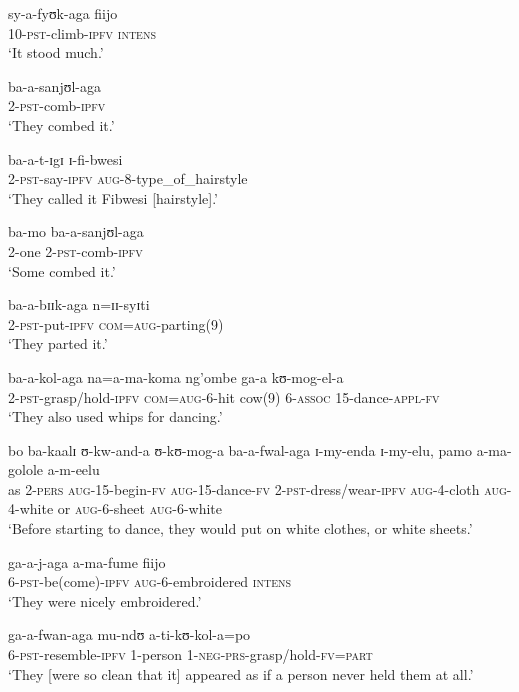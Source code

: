 \begin{exe}
\ex \gll sy-a-fyʊk-aga fiijo\\
10-\textsc{pst}-climb-\textsc{ipfv} \textsc{intens}\\
\glt \lq It stood much.'

\ex \gll ba-a-sanjʊl-aga\\
2-\textsc{pst}-comb-\textsc{ipfv}\\
\glt \lq They combed it.'

\ex \gll ba-a-t-ɪgɪ ɪ-fi-bwesi\\
2-\textsc{pst}-say-\textsc{ipfv} \textsc{aug}-8-type\_of\_hairstyle\\
\glt \lq They called it Fibwesi [hairstyle].'

\ex \gll ba-mo ba-a-sanjʊl-aga\\
2-one 2-\textsc{pst}-comb-\textsc{ipfv}\\
\glt \lq Some combed it.'

\ex \gll ba-a-bɪɪk-aga n=ɪɪ-syɪti\\
2-\textsc{pst}-put-\textsc{ipfv} \textsc{com}=\textsc{aug}-parting(9)\\
\glt \lq They parted it.'


\ex \gll ba-a-kol-aga na=a-ma-koma ng'ombe ga-a kʊ-mog-el-a\\
2-\textsc{pst}-grasp/hold-\textsc{ipfv} \textsc{com}=\textsc{aug}-6-hit cow(9) 6-\textsc{assoc} 15-dance-\textsc{appl}-\textsc{fv}\\
\glt \lq They also used whips for dancing.'

\ex \gll bo ba-kaalɪ ʊ-kw-and-a ʊ-kʊ-mog-a ba-a-fwal-aga ɪ-my-enda ɪ-my-elu, pamo a-ma-golole a-m-eelu\\
as 2-\textsc{pers} \textsc{aug}-15-begin-\textsc{fv} \textsc{aug}-15-dance-\textsc{fv} 2-\textsc{pst}-dress/wear-\textsc{ipfv} \textsc{aug}-4-cloth \textsc{aug}-4-white or \textsc{aug}-6-sheet \textsc{aug}-6-white\\
\glt \lq Before starting to dance, they would put on white clothes, or white sheets.'

\ex \gll ga-a-j-aga a-ma-fume fiijo\\
6-\textsc{pst}-be(come)-\textsc{ipfv} \textsc{aug}-6-embroidered \textsc{intens}\\
\glt \lq They were nicely embroidered.'

\ex \gll ga-a-fwan-aga mu-ndʊ a-ti-kʊ-kol-a=po\\
6-\textsc{pst}-resemble-\textsc{ipfv} 1-person 1-\textsc{neg}-\textsc{prs}-grasp/hold-\textsc{fv}=\textsc{part}\\
\glt \lq They [were so clean that it] appeared as if a person never held them at all.'


\end{exe}
